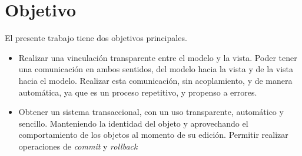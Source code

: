 \section{Objetivo}
\label{sec:Objetivo}
El presente trabajo tiene dos objetivos principales.  

\begin{itemize}
    
  \item Realizar una vinculación transparente entre el modelo y la vista.
  Poder tener una comunicación en ambos sentidos, del modelo hacia la vista y
  de la vista hacia el modelo.
  Realizar esta comunicación, sin acoplamiento, y de manera automática, ya que
  es un proceso repetitivo, y propenso a errores.
  
  
  \item Obtener un sistema transaccional, con un uso transparente, automático y
  sencillo. Manteniendo la identidad del objeto  y aprovechando el
  comportamiento de los objetos al momento de su edición.
  Permitir realizar operaciones de \emph{commit} y \emph{rollback}
\end{itemize}
